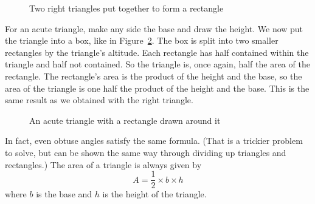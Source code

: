 \documentclass[a4paper,10pt]{report}
\begin{document}
\begin{figure}

  \caption{Two right triangles put together to form a rectangle}
  \label{ar:triangle-rectangle}
\end{figure}

For an acute triangle, make any side the base and draw the height. We now put
the triangle into a box, like in Figure~\ref{ar:boxed-acute}. The box is split
into two smaller rectangles by the triangle's altitude. Each rectangle has half
contained within the triangle and half not contained. So the triangle is, once
again, half the area of the rectangle. The rectangle's area is the product of
the height and the base, so the area of the triangle is one half the product of
the height and the base. This is the same result as we obtained with the right
triangle.

\begin{figure}

  \caption{An acute triangle with a rectangle drawn around it}
  \label{ar:boxed-acute}
\end{figure}

In fact, even obtuse angles satisfy the same formula. (That is a trickier
problem to solve, but can be shown the same way through dividing up triangles
and rectangles.) The area of a triangle is always given by \begin{equation} A =
\frac{1}{2} \times b \times h \end{equation} where \(b\) is the base and \(h\)
is the height of the triangle.
\end{document}

